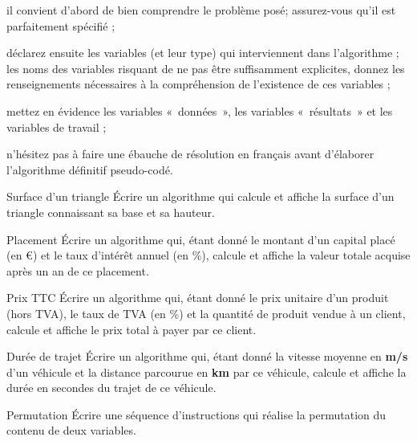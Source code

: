	\begin{liste}
	\item {
		il convient d’abord de bien comprendre le problème posé; assurez-vous
		qu’il est parfaitement spécifié ;}
	\item {
		déclarez ensuite les variables (et leur type) qui interviennent dans
		l’algorithme ; les noms des variables risquant de ne pas être
		suffisamment explicites, donnez les renseignements nécessaires à la
		compréhension de l’existence de ces variables ;}
	\item {
		mettez en évidence les variables «~données~», les variables
		«~résultats~» et les variables de travail ;}
	\item {
		n’hésitez pas à faire une ébauche de résolution en français avant
		d’élaborer l’algorithme définitif pseudo-codé.}
	\end{liste}

\begin{Exercice}{Surface d'un triangle}
	Écrire un algorithme qui calcule et affiche la surface
	d'un triangle connaissant sa base et sa hauteur.
\end{Exercice}

\begin{Exercice}{Placement}
	Écrire un algorithme qui, étant donné le montant d’un capital placé (en
	€) et le taux d’intérêt annuel (en \%), calcule et affiche la valeur
	totale acquise après un an de ce placement.
\end{Exercice}

\begin{Exercice}{Prix TTC}
	Écrire un algorithme qui, étant donné le prix unitaire d’un produit
	(hors TVA), le taux de TVA (en \%) et la quantité de produit vendue à
	un client, calcule et affiche le prix total à payer par ce client.
\end{Exercice}

\begin{Exercice}{Durée de trajet}
	Écrire un algorithme qui, étant donné la vitesse moyenne en \textbf{m/s}
	d’un véhicule et la distance parcourue en \textbf{km} par ce véhicule,
	calcule et affiche la durée en secondes du trajet de ce véhicule.
\end{Exercice}

\begin{Exercice}{Permutation}
	Écrire une séquence d’instructions qui réalise la permutation du contenu
	de deux variables.
\end{Exercice}

